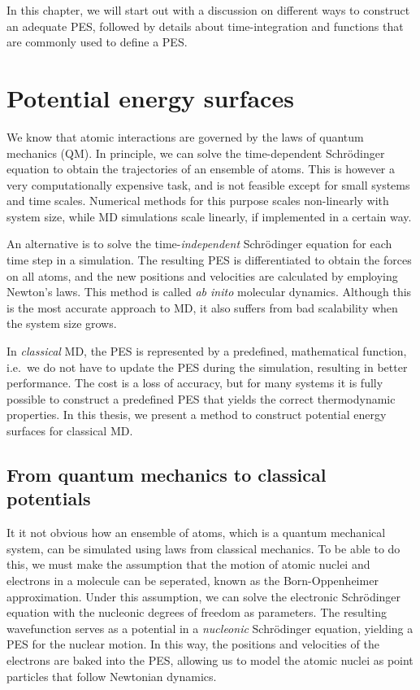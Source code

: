 \documentclass[twoside,english]{uiofysmaster}
\begin{document}
In this chapter, we will start out with a discussion on different ways to construct an adequate PES, followed 
by details about time-integration and functions that are commonly used to define a PES. 

\section{Potential energy surfaces} \label{sec:potentialEnergySurfaces}
We know that atomic interactions are governed by the laws of quantum mechanics (QM). 
In principle, we can solve the time-dependent Schr\"{o}dinger equation to obtain the trajectories of 
an ensemble of atoms. This is however a very computationally expensive task, and is not feasible except for
small systems and time scales. Numerical methods for this purpose scales non-linearly with system size, while
MD simulations scale linearly, if implemented in a certain way. 

An alternative is to solve the time-\textit{independent} Schr\"{o}dinger equation for each time step in a simulation. 
The resulting PES is differentiated to obtain the forces on all atoms, and the new positions and velocities are calculated
by employing Newton's laws. This method is called \textit{ab inito} molecular dynamics. Although this is the most accurate
approach to MD, it also suffers from bad scalability when the system size grows. 

In \textit{classical} MD, the PES is represented by a predefined, mathematical function, i.e.\ we do not have to 
update the PES during the simulation, resulting in better performance. The cost is a loss of accuracy, but for many 
systems it is fully possible to construct a predefined PES that yields the correct thermodynamic properties. 
In this thesis, we present a method to construct potential energy surfaces for classical MD.

\subsection{From quantum mechanics to classical potentials} \label{sec:bornOppenheimer}
It it not obvious how an ensemble of atoms, which is a quantum mechanical system, can be simulated using 
laws from classical mechanics. To be able to do this,
we must make the assumption that the motion of atomic nuclei and electrons in a molecule
can be seperated, known as the Born-Oppenheimer approximation. 
Under this assumption, we can solve the electronic Schr\"{o}dinger equation with the nucleonic degrees of freedom as parameters.
The resulting wavefunction serves as a potential in a \textit{nucleonic} Schr\"{o}dinger equation, yielding a PES 
for the nuclear motion. In this way, the positions and velocities of the electrons are baked into the PES, 
allowing us to model the atomic nuclei as point particles that follow Newtonian dynamics. 
\end{document}

